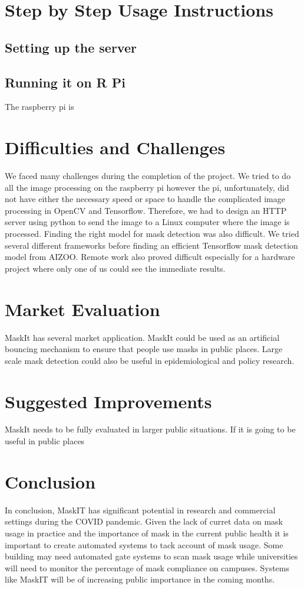 \documentclass[conference, 12pt, onecolumn]{IEEEtran}
\begin{document}
\section{Step by Step Usage Instructions}
\subsection{Setting up the server}

\subsection{Running it on R Pi}
The raspberry pi is 

\section{Difficulties and Challenges}
We faced many challenges during the completion of the project. We tried to do all the image processing on the raspberry pi however the pi, unfortunately, did not have either the necessary speed or space to handle the complicated image processing in OpenCV and Tensorflow. Therefore, we had to design an HTTP server using python to send the image to a Linux computer where the image is processed. Finding the right model for mask detection was also difficult. We tried several different frameworks before finding an efficient Tensorflow mask detection model from AIZOO. Remote work also proved difficult especially for a hardware project where only one of us could see the immediate results.
\section{Market Evaluation}
MaskIt has several market application. MaskIt could be used as an artificial bouncing mechanism to ensure that people use masks in public places. Large scale mask detection could also be useful in epidemiological and policy research. 
\section{Suggested Improvements}
MaskIt needs to be fully evaluated in larger public situations. If it is going to be useful in public places 
\section{Conclusion}
In conclusion, MaskIT has significant potential in research and commercial settings during the COVID pandemic. Given the lack of curret data on mask usage in practice and the importance of mask in the current public health it is important to create automated systems to tack account of mask usage. Some building may need automated gate systems to scan mask usage while universities will need to monitor the percentage of mask compliance on campuses. Systems like MaskIT will be of increasing public importance in the coming months. 



\end{document}
